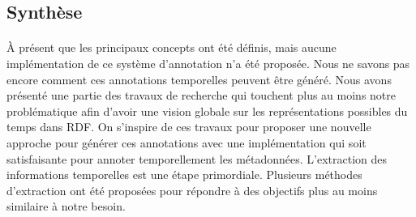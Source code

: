 \subsection{Synthèse}
\paragraph{}
À présent que les principaux concepts ont été définis, mais aucune implémentation de ce système d'annotation n'a été proposée. Nous ne savons pas encore comment ces annotations temporelles peuvent être généré. Nous avons présenté une partie des travaux de recherche qui touchent plus au moins notre problématique afin d'avoir une vision globale sur les représentations possibles du temps dans RDF. On s'inspire de ces travaux pour proposer une nouvelle approche pour générer ces annotations avec une implémentation qui soit satisfaisante pour annoter temporellement les métadonnées. L'extraction des informations temporelles est une étape primordiale. Plusieurs méthodes d'extraction ont été proposées pour répondre à des objectifs plus au moins similaire à notre besoin.


